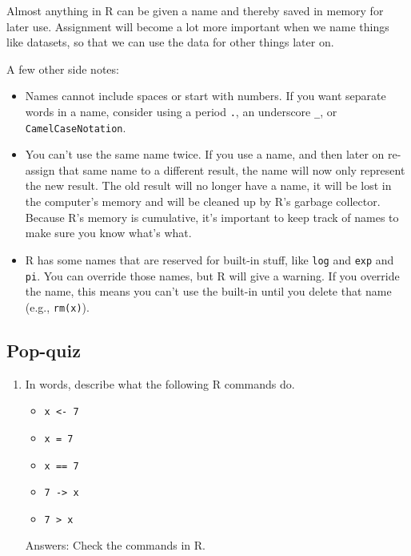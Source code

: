 \documentclass[
  letterpaper,
  DIV=11,
  numbers=noendperiod]{scrreprt}
\begin{document}
Almost anything in R can be given a name and thereby saved in memory for
later use. Assignment will become a lot more important when we name
things like datasets, so that we can use the data for other things later
on.

A few other side notes:

\begin{itemize}
\item
  Names cannot include spaces or start with numbers. If you want
  separate words in a name, consider using a period \texttt{.}, an
  underscore \texttt{\_}, or \texttt{CamelCaseNotation}.
\item
  You can't use the same name twice. If you use a name, and then later
  on re-assign that same name to a different result, the name will now
  only represent the new result. The old result will no longer have a
  name, it will be lost in the computer's memory and will be cleaned up
  by R's garbage collector. Because R's memory is cumulative, it's
  important to keep track of names to make sure you know what's what.
\item
  R has some names that are reserved for built-in stuff, like
  \texttt{log} and \texttt{exp} and \texttt{pi}. You can override those
  names, but R will give a warning. If you override the name, this means
  you can't use the built-in until you delete that name (e.g.,
  \texttt{rm(x)}).
\end{itemize}

\hypertarget{pop-quiz}{%
\subsection{Pop-quiz}\label{pop-quiz}}

\begin{enumerate}
\def\labelenumi{\arabic{enumi}.}
\item
  In words, describe what the following R commands do.

  \begin{itemize}
  \item
    \texttt{x\ \textless{}-\ 7}
  \item
    \texttt{x\ =\ 7}
  \item
    \texttt{x\ ==\ 7}
  \item
    \texttt{7\ -\textgreater{}\ x}
  \item
    \texttt{7\ \textgreater{}\ x}
  \end{itemize}

  Answers: Check the commands in R.
\end{enumerate}
\end{document}
